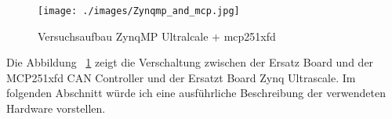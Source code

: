 \begin{figure}[h]
	\begin{center}
		\texttt{[image: ./images/Zynqmp\_and\_mcp.jpg]}
	\end{center}
	\vspace{-5pt}
	\caption[Versuchsaufbau ZynqMP Ultralcale + mcp251xfd]{Versuchsaufbau ZynqMP Ultralcale + mcp251xfd} %
	\label{fig:zynqmp:and:cancontroller}
	\vspace{-5pt}
\end{figure}

Die Abbildung ~\ref{fig:zynqmp:and:cancontroller} zeigt die Verschaltung zwischen der Ersatz Board und der MCP251xfd CAN Controller und der Ersatzt Board Zynq Ultrascale. Im folgenden Abschnitt würde ich eine ausführliche Beschreibung der verwendeten Hardware vorstellen.  